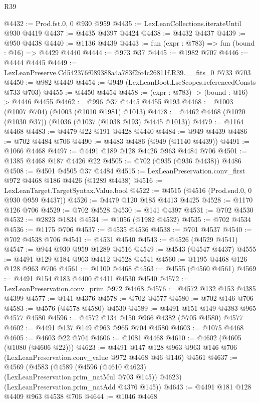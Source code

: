 \begin{lexlean}{R39}
\begin{coremodule}
@4432 := Prod.fst.{0, 0} @930 @959
@4435 := LexLeanCollections.iterateUntil @930 @4419
@4437 := @4435 @4397 @4424
@4438 := @4432 @4437
@4439 := @950 @4438
@4440 := @1136 @4439
@4443 := fun (expr : @783) => fun (bound : @16) => @4429 @4440
@4444 := @973 @37
@4445 := @1982 @707
@4446 := @4444 @4445
@4449 := LexLeanPreserve.Cd542376f089388a4a783f2fc4c26811f.R39.__fits_0 @733 @703
@4450 := @982 @4449
@4454 := @949 (LexLeanBoot.LseScopes.referencedConsts @733 @703)
@4455 := @4450 @4454
@4458 := (expr : @783) -> (bound : @16) -> @4446 @4455
@4462 := @996 @37 @4445 @4455 @193
@4468 := @1003 (@1007 @704) (@1003 (@1010 @1981) @1013)
@4478 := @4462 @4468 (@1020 (@1030 @37)) (@1036 (@1037 (@1038 @193) @4445 @1013))
@4479 := @1164 @4468
@4483 := @4479 @22 @191 @4428 @4440
@4484 := @949 @4439
@4486 := @702 @4484 @706
@4490 := @4483 @4486 (@949 (@1140 @4439))
@4491 := @1066 @4468
@4497 := @4491 @189 @128 @4426 @963 @4484 @706
@4501 := @1385 @4468 @187 @4426 @22
@4505 := @702 (@935 (@936 @4438)) @4486
@4508 := @4501 @4505 @37 @4484
@4515 := LexLeanPreservation.conv_first @972 @4468 @186 @4426 (@1289 @4438)
@4516 := LexLeanTarget.TargetSyntax.Value.bool
@4522 := @4515 (@4516 (Prod.snd.{0, 0} @930 @959 @4437))
@4526 := @4479 @120 @185 @4413 @4425
@4528 := @1170 @126 @706
@4529 := @702 @4528
@4530 := @141 @4397
@4531 := @702 @4530
@4532 := @2823 @1834
@4534 := @1056 (@1982 @4532)
@4535 := @702 @4534
@4536 := @1175 @706
@4537 := @4535 @4536
@4538 := @701 @4537
@4540 := @702 @4538 @706
@4541 := @4531 @4540
@4543 := @4526 (@4529 @4541)
@4547 := @944 @930 @959 @1289 @4516
@4549 := @4543 (@4547 @4437)
@4555 := @4491 @129 @184 @963 @4412 @4528 @4541
@4560 := @1195 @4468 @126 @128 @963 @706
@4561 := @1100 @4468
@4563 := @4555 (@4560 @4561)
@4569 := @4491 @154 @183 @4400 @4411 @4530 @4540
@4572 := LexLeanPreservation.conv_prim @972 @4468
@4576 := @4572 @132 @153 @4385 @4399
@4577 := @141 @4376
@4578 := @702 @4577
@4580 := @702 @146 @706
@4583 := @4576 (@4578 @4580) @4530
@4589 := @4491 @151 @149 @4383 @965 @4577 @4580
@4596 := @4572 @134 @150 @966 @4382 (@705 @4580) @4577
@4602 := @4491 @137 @149 @963 @965 @704 @4580
@4603 := @1075 @4468
@4605 := @4603 @22 @704
@4606 := @1081 @4468
@4610 := @4602 (@4605 (@1080 (@4606 @22)))
@4623 := @4491
    @147
    @128
    @963
    @963
    @146
    @706
    (LexLeanPreservation.conv_value @972 @4468 @46 @146)
    @4561
@4637 := @4569
    (@4583
      (@4589 (@4596 (@4610 @4623) (LexLeanPreservation.prim_natMul @703 @145)) @4623)
      (LexLeanPreservation.prim_natAdd @4376 @145))
@4643 := @4491 @181 @128 @4409 @963 @4538 @706
@4644 := @1046 @4468

\end{coremodule}
\end{lexlean}
